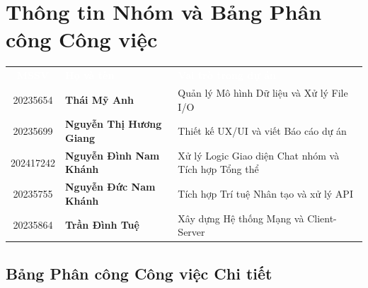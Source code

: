 \documentclass[12pt, a4paper, oneside]{report}
\newcommand{\rA}{\rowcolor{rowA}}
\newcommand{\rB}{\rowcolor{rowB}}
\begin{document}
\newpage
\tableofcontents

\newpage
\listoftables

\newpage
\listoffigures

\newpage
\chapter*{Thông tin Nhóm và Bảng Phân công Công việc}

\vspace{-6pt}
\begin{tcolorbox}[infostyle, title={Danh sách Thành viên Nhóm 18}]
\begin{tabularx}{\linewidth}{c >{\bfseries}l X}
  \rowcolor{headerrow}
  \textcolor{white}{\textbf{MSSV}} &
  \textcolor{white}{\textbf{Họ và tên}} &
  \textcolor{white}{\textbf{Vai trò trong dự án}} \\
  \rA 20235654  & Thái Mỹ Anh            & Quản lý Mô hình Dữ liệu và Xử lý File I/O \\
  \rB 20235699  & Nguyễn Thị Hương Giang & Thiết kế UX/UI và viết Báo cáo dự án \\
  \rA 202417242 & Nguyễn Đình Nam Khánh  & Xử lý Logic Giao diện Chat nhóm và Tích hợp Tổng thể \\
  \rB 20235755  & Nguyễn Đức Nam Khánh   & Tích hợp Trí tuệ Nhân tạo và xử lý API \\
  \rA 20235864  & Trần Đình Tuệ          & Xây dựng Hệ thống Mạng và Client-Server \\
\end{tabularx}
\end{tcolorbox}

\bigskip
\section*{Bảng Phân công Công việc Chi tiết}
\end{document}

